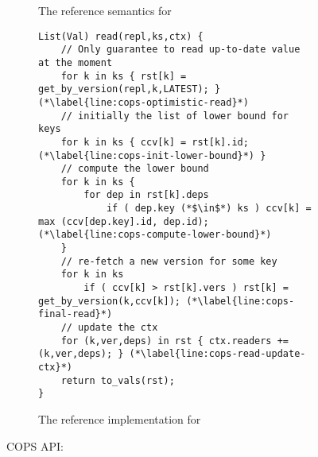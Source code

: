 \begin{figure}[!hp]
\begin{subfigure}{\textwidth}
\caption{The reference semantics for \pcopsread}
\label{fig:cops-semantics-read}

\end{subfigure}

\hrulefill

\begin{subfigure}{\textwidth}

\begin{lstlisting}[caption={},label={}]
List(Val) read(repl,ks,ctx) {
    // Only guarantee to read up-to-date value at the moment
    for k in ks { rst[k] = get_by_version(repl,k,LATEST); } (*\label{line:cops-optimistic-read}*)
    // initially the list of lower bound for keys
    for k in ks { ccv[k] = rst[k].id; (*\label{line:cops-init-lower-bound}*) }
    // compute the lower bound
    for k in ks { 
        for dep in rst[k].deps 
            if ( dep.key (*$\in$*) ks ) ccv[k] = max (ccv[dep.key].id, dep.id); (*\label{line:cops-compute-lower-bound}*) 
    } 
    // re-fetch a new version for some key
    for k in ks 
        if ( ccv[k] > rst[k].vers ) rst[k] = get_by_version(k,ccv[k]); (*\label{line:cops-final-read}*)
    // update the ctx
    for (k,ver,deps) in rst { ctx.readers += (k,ver,deps); } (*\label{line:cops-read-update-ctx}*)
    return to_vals(rst); 
}                                   
\end{lstlisting}

\caption{The reference implementation for \pcopsread}
\label{lst:cops-read}

\end{subfigure}

\hrulefill

\caption{COPS API: \pcopsread}
\label{fig:cops-api-read}

\end{figure}
